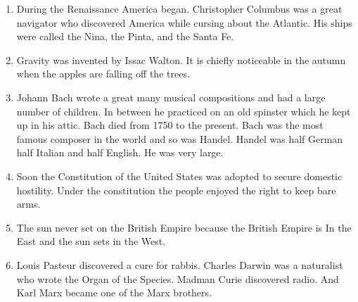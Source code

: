 \begin{enumerate}
\item
During the Renaissance America began. Christopher
Columbus was a great navigator who discovered America while
cursing about the Atlantic. His ships were called the Nina,
the Pinta, and the Santa Fe.

\item
Gravity was invented by Issac Walton. It is chiefly
noticeable in the autumn when the apples are falling
off the trees.

\item
Johann Bach wrote a great many musical compositions and
had a large number of children. In between he practiced on
an old spinster which he kept up in his attic. Bach died
from 1750 to the present. Bach was the most famous composer
in the world and so was Handel. Handel was half German
half Italian and half English. He was very large.

\item
Soon the Constitution of the United States was adopted
to secure domestic hostility. Under the constitution the
people enjoyed the right to keep bare arms.

\item
The sun never set on the British Empire because the
British Empire is In the East and the sun sets in the West.

\item
Louis Pasteur discovered a cure for rabbis. Charles
Darwin was a naturalist who wrote the Organ of the Species.
Madman Curie discovered radio. And Karl Marx became one of
the Marx brothers.

\end{enumerate}
